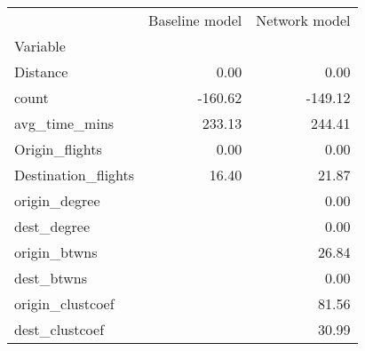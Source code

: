 \begin{tabular}{lrr}
\toprule
{} &  Baseline model &  Network model \\
Variable            &                 &                \\
\midrule
Distance            &            0.00 &           0.00 \\
count               &         -160.62 &        -149.12 \\
avg\_time\_mins       &          233.13 &         244.41 \\
Origin\_flights      &            0.00 &           0.00 \\
Destination\_flights &           16.40 &          21.87 \\
origin\_degree       &                 &           0.00 \\
dest\_degree         &                 &           0.00 \\
origin\_btwns        &                 &          26.84 \\
dest\_btwns          &                 &           0.00 \\
origin\_clustcoef    &                 &          81.56 \\
dest\_clustcoef      &                 &          30.99 \\
\bottomrule
\end{tabular}
